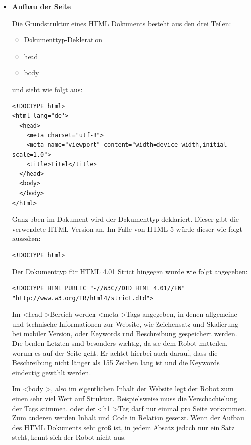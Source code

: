 {    \begin{itemize}
      \item \textbf{Aufbau der Seite}

        Die Grundstruktur eines HTML Dokuments besteht aus den drei Teilen:

        \begin{itemize}
          \item Dokumenttyp-Dekleration
          \item head
          \item body
        \end{itemize}

        und sieht wie folgt aus:

\lstset{language = html}
\begin{lstlisting}
<!DOCTYPE html>
<html lang="de">
  <head>
    <meta charset="utf-8">
    <meta name="viewport" content="width=device-width,initial-scale=1.0">
    <title>Titel</title>
  </head>
  <body>
  </body>
</html>
\end{lstlisting}

        Ganz oben im Dokument wird der Dokumenttyp deklariert. Dieser gibt die verwendete HTML Version an. Im Falle von HTML 5 würde dieser wie folgt aussehen:

\lstset{language = html}
\begin{lstlisting}
<!DOCTYPE html>
\end{lstlisting}

        Der Dokumenttyp für HTML 4.01 Strict hingegen wurde wie folgt angegeben:

\lstset{language = html}
\begin{lstlisting}
<!DOCTYPE HTML PUBLIC "-//W3C//DTD HTML 4.01//EN"
"http://www.w3.org/TR/html4/strict.dtd">
\end{lstlisting}

        Im \textless head \textgreater Bereich werden \textless meta \textgreater Tags angegeben, in denen allgemeine und technische Informationen zur Website, wie Zeichensatz
        und Skalierung bei mobiler Version, oder Keywords und Beschreibung gespeichert werden.
        Die beiden Letzten sind besonders wichtig, da sie dem Robot mitteilen, worum es auf der Seite geht. Er achtet hierbei auch darauf, dass die Beschreibung nicht
        länger als 155 Zeichen lang ist und die Keywords eindeutig gewählt werden.

        Im \textless body \textgreater, also im eigentlichen Inhalt der Website legt der Robot zum einen sehr viel Wert auf Struktur. Beispielsweise muss die Verschachtelung der Tags stimmen,
        oder der \textless h1 \textgreater Tag darf nur einmal pro Seite vorkommen.
        Zum anderen werden Inhalt und Code in Relation gesetzt. Wenn der Aufbau des HTML Dokuments sehr groß ist, in jedem Absatz jedoch nur ein Satz steht, kennt sich der Robot nicht aus.


\end{itemize}}
